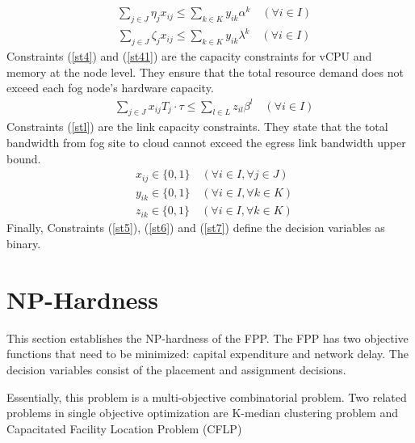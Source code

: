 \documentclass[10pt,journal,compsoc]{IEEEtran}
\newcommand{\Eq}[1]{(\ref{#1})}
\begin{document}
\begin{align}
&\sum_{j\in J} \eta_j x_{ij} \leq \sum_{k\in K} y_{ik}\alpha^k \quad(\forall i \in I)\label{st4}
\end{align}
\begin{align}
&\sum_{j\in J} \zeta_j x_{ij} \leq \sum_{k\in K} y_{ik}\lambda^k \quad(\forall i \in I)\label{st41}
\end{align}
Constraints \Eq{st4} and \Eq{st41} are the capacity constraints for vCPU and memory at the node level. They ensure that the total resource demand does not exceed each fog node's hardware capacity. 
\begin{align}
&\sum_{j\in J} x_{ij} T_j \cdot \tau \leq \sum_{l\in L} z_{il} \beta^l\quad(\forall i \in I) \label{stl}
\end{align}
Constraints \Eq{stl} are the link capacity constraints. They state that the total bandwidth from fog site to cloud cannot exceed the egress link bandwidth upper bound.\\
\begin{align}
&x_{ij} \in \{0,1\} \quad (\forall i \in I, \forall j \in J)\label{st5}\\
& y_{ik} \in \{0,1\} \quad (\forall i \in I, \forall k \in K)\label{st6}\\
& z_{ik} \in \{0,1\} \quad (\forall i \in I, \forall k \in K)\label{st7}
\end{align}
Finally, Constraints \Eq{st5}, \Eq{st6} and \Eq{st7} define the decision variables as binary.

\section{NP-Hardness}\label{nphard}
This section establishes the NP-hardness of the FPP.
The FPP has two objective functions that need to be minimized: capital expenditure and network delay. The decision variables consist of the placement and assignment decisions. %

Essentially, this problem is a multi-objective combinatorial problem.
Two related problems in single objective optimization are K-median clustering problem and Capacitated Facility Location Problem (CFLP)
\end{document}
